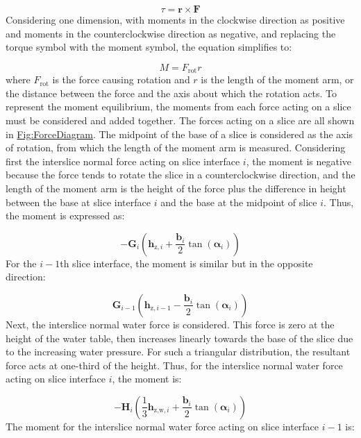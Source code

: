 \documentclass[12pt]{article}
\begin{document}
\begin{displaymath}
τ=\mathbf{r}\times\mathbf{F}
\end{displaymath}
Considering one dimension, with moments in the clockwise direction as positive and moments in the counterclockwise direction as negative, and replacing the torque symbol with the moment symbol, the equation simplifies to:

\begin{displaymath}
M={F_{\text{rot}}} r
\end{displaymath}
where ${F_{\text{rot}}}$ is the force causing rotation and $r$ is the length of the moment arm, or the distance between the force and the axis about which the rotation acts. To represent the moment equilibrium, the moments from each force acting on a slice must be considered and added together. The forces acting on a slice are all shown in \hyperref[Figure:ForceDiagram]{Fig:ForceDiagram}. The midpoint of the base of a slice is considered as the axis of rotation, from which the length of the moment arm is measured. Considering first the interslice normal force acting on slice interface $i$, the moment is negative because the force tends to rotate the slice in a counterclockwise direction, and the length of the moment arm is the height of the force plus the difference in height between the base at slice interface $i$ and the base at the midpoint of slice $i$. Thus, the moment is expressed as:

\begin{displaymath}
-{\mathbf{G}}_{i} \left({\mathbf{h}_{\text{z},i}}+\frac{{\mathbf{b}}_{i}}{2} \tan\left({\mathbf{α}}_{i}\right)\right)
\end{displaymath}
For the $i-1$th slice interface, the moment is similar but in the opposite direction:

\begin{displaymath}
{\mathbf{G}}_{i-1} \left({\mathbf{h}_{\text{z},i-1}}-\frac{{\mathbf{b}}_{i}}{2} \tan\left({\mathbf{α}}_{i}\right)\right)
\end{displaymath}
Next, the interslice normal water force is considered. This force is zero at the height of the water table, then increases linearly towards the base of the slice due to the increasing water pressure. For such a triangular distribution, the resultant force acts at one-third of the height. Thus, for the interslice normal water force acting on slice interface $i$, the moment is:

\begin{displaymath}
-{\mathbf{H}}_{i} \left(\frac{1}{3} {\mathbf{h}_{\text{z,w},i}}+\frac{{\mathbf{b}}_{i}}{2} \tan\left({\mathbf{α}}_{i}\right)\right)
\end{displaymath}
The moment for the interslice normal water force acting on slice interface $i-1$ is:
\end{document}
